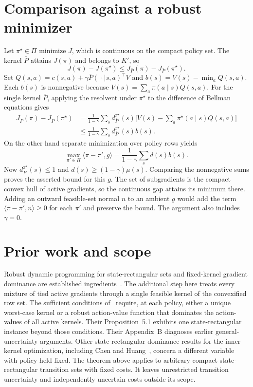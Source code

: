 \documentclass[11pt]{amsart}
\begin{document}
\section{Comparison against a robust minimizer}
Let \(\pi^\star\in\Pi\) minimize \(J\), which is continuous on the compact policy set. The kernel \(\bar P\) attains \(J(\pi)\) and belongs to \(K'\), so
\[
 J(\pi)-J(\pi^\star)\le J_{\bar P}(\pi)-J_{\bar P}(\pi^\star).
\]
Set \(Q(s,a)=c(s,a)+\gamma\bar P(\,\cdot\mid s,a)^\top V\)
and \(b(s)=V(s)-\min_a Q(s,a)\). Each \(b(s)\) is nonnegative because \(V(s)=\sum_a\pi(a\mid s)Q(s,a)\). For the single kernel \(\bar P\), applying the resolvent under \(\pi^\star\) to the difference of Bellman equations gives
\[
\begin{split}
 J_{\bar P}(\pi)-J_{\bar P}(\pi^\star)
  &= \frac{1}{1-\gamma}\sum_s d_{\bar P}^{\pi^\star}(s)
           \Big[V(s)-\sum_a\pi^\star(a\mid s)Q(s,a)\Big]\\
  &\leq \frac{1}{1-\gamma}\sum_s d_{\bar P}^{\pi^\star}(s)b(s).
\end{split}
\]
On the other hand separate minimization over policy rows yields
\[
 \max_{\pi'\in\Pi}\langle\pi-\pi',g\rangle
 =\frac{1}{1-\gamma}\sum_s d(s)b(s).
\]
Now \(d_{\bar P}^{\pi^\star}(s)\leq1\) and \(d(s)\geq (1-\gamma)\mu(s)\). Comparing the nonnegative sums proves the asserted bound for this \(g\). The set of subgradients is the compact convex hull of active gradients, so the continuous gap attains its minimum there. Adding an outward feasible-set normal \(n\) to an ambient \(g\) would add the term \(\langle \pi-\pi',n\rangle\geq0\) for each \(\pi'\) and preserve the bound. The argument also includes \(\gamma=0\).

\section{Prior work and scope}
Robust dynamic programming for state-rectangular sets and fixed-kernel gradient dominance are established ingredients~\cite{WKR,HPW,A}. The additional step here treats every mixture of tied active gradients through a single feasible kernel of the convexified row set. The sufficient conditions of~\cite[Theorem~4.3]{K} require, at each policy, either a unique worst-case kernel or a robust action-value function that dominates the action-values of all active kernels. Their Proposition~5.1 exhibits one state-rectangular instance beyond those conditions. Their Appendix~B diagnoses earlier general-uncertainty arguments. Other state-rectangular dominance results for the inner kernel optimization, including Chen and Huang~\cite[Proposition~3]{CH}, concern a different variable with policy held fixed. The theorem above applies to arbitrary compact state-rectangular transition sets with fixed costs. It leaves unrestricted transition uncertainty and independently uncertain costs outside its scope.
\end{document}

